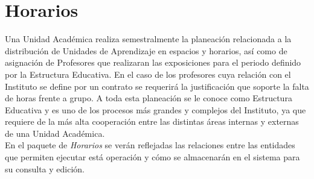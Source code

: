 \section{Horarios}

Una Unidad Académica realiza semestralmente la planeación relacionada a la distribución de Unidades de Aprendizaje en espacios y horarios, así como de asignación de Profesores que realizaran las exposiciones para el periodo definido por la Estructura Educativa. En el caso de los profesores cuya relación con el Instituto se define por un contrato se requerirá la justificación que soporte la falta de horas frente a grupo. A toda esta planeación se le conoce como Estructura Educativa y es uno de los procesos más grandes y complejos del Instituto, ya que requiere de la más alta cooperación entre las distintas áreas internas y externas de una Unidad Académica.\\

En el paquete de \textit{Horarios} se verán reflejadas las relaciones entre las entidades que permiten ejecutar está operación y cómo se almacenarán en el sistema para su consulta y edición.\\

